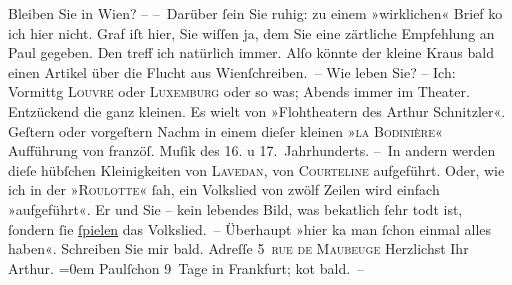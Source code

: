 \begin{ledgroupsized}[t]{13cm}
           \pstart
           Bleiben Sie in Wien? – \pend
           \pstart
           – Darüber ſein Sie ruhig: zu einem »wirklichen« Brief ko{\geminationm} ich hier nicht.\pend
           \pstart
           Graf iſt hier, Sie wiſſen ja, dem Sie eine
               zärtliche Empfehlung an Paul gegeben. Den
               treff ich natürlich immer. {\pb}Alſo könnte der kleine Kraus bald einen Artikel über die Flucht aus
                  Wienſchreiben. –\pend
           \pstart
           Wie leben Sie? – \pend
           \pstart
           Ich: Vormittg \textsc{Louvre} oder \textsc{Luxemburg} oder so was; Abends immer im Theater. Entzückend die ganz kleinen. Es wi{\geminationm}elt von »Flohtheatern des Arthur Schnitzler«.\pend
           \pstart
           {\pb}Geſtern oder vorgeſtern Nachm in einem dieſer kleinen
                  »\textsc{la Bodinière}« Aufführung von \introOben{}franzöſ.\introOben{} Muſik des 16. u 17. Jahrhunderts.\pend
           \pstart
           – In andern werden dieſe hübſchen Kleinigkeiten von \textsc{Lavedan}, von \textsc{Courteline} aufgeführt. Oder, wie ich \label{K_L00670-2v}\label{K_L00670-2h} in der »\textsc{Roulotte}« ſah, ein Volkslied von zwölf Zeilen wird einfach »aufgeführt«. Er und {\pb}Sie – kein lebendes Bild, was beka{\geminationn}tlich ſehr todt ist, ſondern ſie \uline{ſpielen} das Volkslied. –\pend
           \pstart
           Überhaupt »hier ka{\geminationn} man ſchon einmal alles haben«.\pend
           \pstart
           Schreiben Sie mir bald.\pend
           \pstart
           Adreſſe 5 \textsc{rue de Maubeuge}\pend
           \pstart
           Herzlichst Ihr{\\[\baselineskip]}\spacefill\mbox{Arthur.}\pend
           \leftskip=0em{}\pstart
           Paulſchon 9 Tage in Frankfurt; ko{\geminationm}t bald. –\pend
           
         
         \endnumbering{}\end{ledgroupsized}  \newcommand{\dateiname}{L00670}\newcommand{\titel}{Arthur Schnitzler an Richard Beer-Hofmann, 26. 4. 1897}\newcommand{\editorInnen}{Martin Anton Müller und Gerd-Hermann Susen}
      